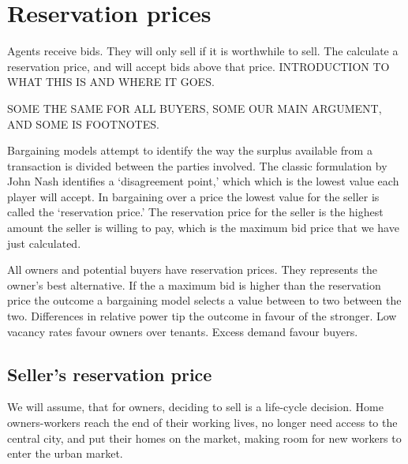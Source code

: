 {{\color{black}
\section{Reservation prices} 
Agents receive bids. They will only sell if it is worthwhile to sell. The calculate a reservation price, and will accept bids above that price. 
INTRODUCTION TO WHAT THIS IS AND WHERE IT GOES.

SOME THE SAME FOR ALL BUYERS, SOME OUR MAIN ARGUMENT, AND SOME IS FOOTNOTES.



Bargaining models attempt to identify the way the surplus available from a transaction is divided between the parties involved. The classic  formulation by John Nash %
identifies a `disagreement point,' which which is the  lowest value each player will accept. In bargaining over a price the lowest value for the seller is called the  `\gls{reservation price}.' The reservation  price for the seller is the highest amount the seller is willing to pay, which is the maximum bid price that we  have just calculated.  

 All owners and potential buyers have  reservation prices. They represents the owner's best alternative. If the a maximum bid is higher than the reservation price the outcome a bargaining model selects a value between to two between the two. Differences in relative power tip the outcome in favour of the stronger. Low vacancy rates favour owners over tenants.  Excess demand favour buyers.
 
\subsection{Seller's reservation price} \label{section-reservation-price}

We will assume,  that for owners, deciding to sell is a life-cycle decision. Home owners-workers  reach the end of their working lives, no longer need access to the central city, and put their homes on the market, making room for new workers to enter the urban market.%


}}
